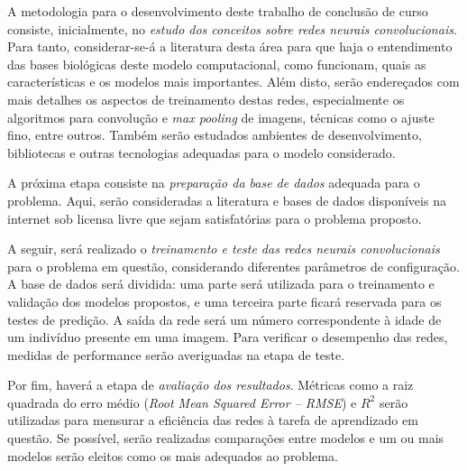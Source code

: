 A metodologia para o desenvolvimento deste trabalho de conclusão de curso consiste, inicialmente, no \emph{estudo dos conceitos sobre redes neurais convolucionais}. Para tanto, considerar-se-á a literatura desta área para que haja o entendimento das bases biológicas deste modelo computacional, como funcionam, quais as características e os modelos mais importantes. Além disto, serão endereçados com mais detalhes os aspectos de treinamento destas redes, especialmente os algoritmos para convolução e \emph{max pooling} de imagens, técnicas como o ajuste fino, entre outros. Também serão estudados ambientes de desenvolvimento, bibliotecas e outras tecnologias adequadas para o modelo considerado.

A próxima etapa consiste na \emph{preparação da base de dados} adequada para o problema. Aqui, serão consideradas a literatura e bases de dados disponíveis na internet sob licensa livre que sejam satisfatórias para o problema proposto.

A seguir, será realizado o \emph{treinamento e teste das redes neurais convolucionais} para o problema em questão, considerando diferentes parâmetros de configuração. A base de dados será dividida: uma parte será utilizada para o treinamento e validação dos modelos propostos, e uma terceira parte ficará reservada para os testes de predição. A saída da rede será um número correspondente à idade de um indivíduo presente em uma imagem. Para verificar o desempenho das redes, medidas de performance serão averiguadas na etapa de teste.

Por fim, haverá a etapa de \emph{avaliação dos resultados}. Métricas como a raiz quadrada do erro médio (\emph{Root Mean Squared Error -- RMSE}) e $R^2$ serão utilizadas para mensurar a eficiência das redes à tarefa de aprendizado em questão. Se possível, serão realizadas comparações entre modelos e um ou mais modelos serão eleitos como os mais adequados ao problema.
